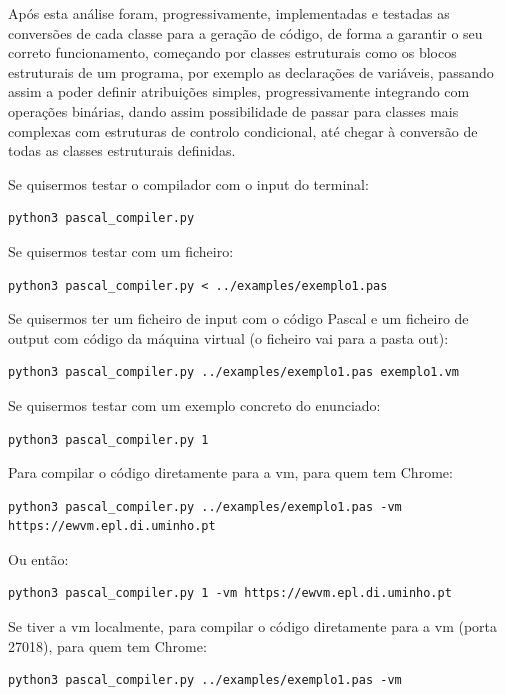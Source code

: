 \documentclass[12pt,a4paper]{report}
\begin{document}
Após esta análise foram, progressivamente, implementadas e testadas as conversões de cada classe para a geração de código, de forma a garantir o seu correto funcionamento, começando por classes estruturais
como os blocos estruturais de um programa, por exemplo as declarações de variáveis, passando assim a poder definir atribuições simples, progressivamente integrando com operações binárias, dando assim possibilidade
de passar para classes mais complexas com estruturas de controlo condicional, até chegar à conversão de todas as classes estruturais definidas.

\vspace{1em}

Se quisermos testar o compilador com o input do terminal:
\begin{verbatim}
python3 pascal_compiler.py
\end{verbatim}

Se quisermos testar com um ficheiro:
\begin{verbatim}
python3 pascal_compiler.py < ../examples/exemplo1.pas
\end{verbatim}

Se quisermos ter um ficheiro de input com o código Pascal e um ficheiro de output com código da máquina virtual (o ficheiro vai para a pasta out):
\begin{verbatim}
python3 pascal_compiler.py ../examples/exemplo1.pas exemplo1.vm
\end{verbatim}

Se quisermos testar com um exemplo concreto do enunciado:
\begin{verbatim}
python3 pascal_compiler.py 1
\end{verbatim}

Para compilar o código diretamente para a vm, para quem tem Chrome:
\begin{verbatim}
python3 pascal_compiler.py ../examples/exemplo1.pas -vm https://ewvm.epl.di.uminho.pt
\end{verbatim}

Ou então:

\begin{verbatim}
python3 pascal_compiler.py 1 -vm https://ewvm.epl.di.uminho.pt
\end{verbatim}

Se tiver a vm localmente, para compilar o código diretamente para a vm (porta 27018), para quem tem Chrome:
\begin{verbatim}
python3 pascal_compiler.py ../examples/exemplo1.pas -vm
\end{verbatim}
\end{document}
